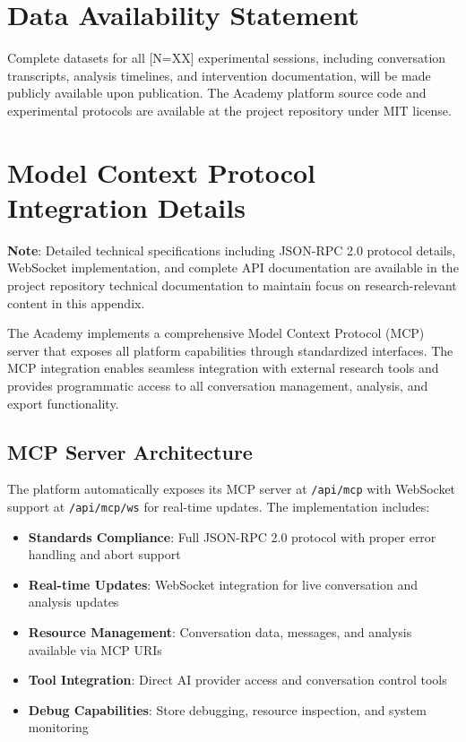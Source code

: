 \documentclass[11pt,letterpaper]{article}
\newcommand{\theacademy}{The Academy}
\newcommand{\totalSessions}{[N=XX]} %
\begin{document}
\section*{Data Availability Statement}

Complete datasets for all \totalSessions{} experimental sessions, including conversation transcripts, analysis timelines, and intervention documentation, will be made publicly available upon publication. \theacademy{} platform source code and experimental protocols are available at the project repository under MIT license.




\appendix

\section{Model Context Protocol Integration Details}
\label{app:mcp}

\textbf{Note}: Detailed technical specifications including JSON-RPC 2.0 protocol details, WebSocket implementation, and complete API documentation are available in the project repository technical documentation to maintain focus on research-relevant content in this appendix.

\theacademy{} implements a comprehensive Model Context Protocol (MCP) server that exposes all platform capabilities through standardized interfaces. The MCP integration enables seamless integration with external research tools and provides programmatic access to all conversation management, analysis, and export functionality.

\subsection{MCP Server Architecture}

The platform automatically exposes its MCP server at \texttt{/api/mcp} with WebSocket support at \texttt{/api/mcp/ws} for real-time updates. The implementation includes:

\begin{itemize}
    \item \textbf{Standards Compliance}: Full JSON-RPC 2.0 protocol with proper error handling and abort support
    \item \textbf{Real-time Updates}: WebSocket integration for live conversation and analysis updates
    \item \textbf{Resource Management}: Conversation data, messages, and analysis available via MCP URIs
    \item \textbf{Tool Integration}: Direct AI provider access and conversation control tools
    \item \textbf{Debug Capabilities}: Store debugging, resource inspection, and system monitoring
\end{itemize}
\end{document}

